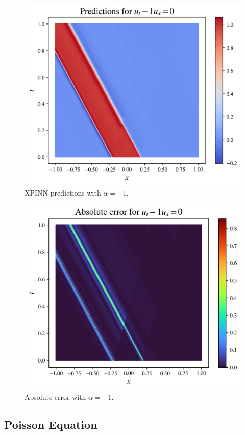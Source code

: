 \begin{figure}[h!]
    \centering
    \includegraphics[width=0.8\linewidth]{Project1XPINNs/figures/advection/xpinn_stress_predictions.png}
    \caption{XPINN predictions with $\alpha=-1$.}
    \label{fig:alpha-1_pred}
\end{figure}
\begin{figure}[h!]
    \centering
    \includegraphics[width=0.8\linewidth]{Project1XPINNs/figures/advection/xpinn_stress_error.png}
    \caption{Absolute error with $\alpha=-1$.}
    \label{fig:alpha-1_error}
\end{figure}


\subsection{Poisson Equation}
